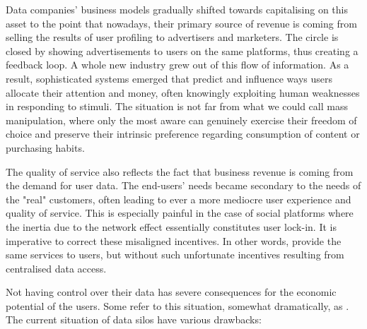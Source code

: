 Data companies' business models gradually shifted towards capitalising on this asset to the point that nowadays, their primary source of revenue is coming from selling the results of user profiling to advertisers and marketers. The circle is closed by showing advertisements to users on the same platforms, thus creating a feedback loop. A whole new industry grew out of this flow of information. As a result, sophisticated systems emerged that predict and influence ways users allocate their attention and money, often knowingly exploiting human weaknesses in responding to stimuli. The situation is not far from what we could call mass manipulation, where only the most aware can genuinely exercise their freedom of choice and preserve their intrinsic preference regarding consumption of content or purchasing habits.

The quality of service also reflects the fact that business revenue is coming from the demand for user data. The end-users' needs became secondary to the needs of the "real" customers, often leading to ever a more mediocre user experience and quality of service. This is especially painful in the case of social platforms where the inertia due to the network effect essentially constitutes user lock-in. It is imperative to correct these misaligned incentives. In other words, provide the same services to users, but without such unfortunate incentives resulting from centralised data access.

Not having control over their data has severe consequences for the economic potential of the users. Some refer to this situation, somewhat dramatically, as . 
The current situation of data silos have various drawbacks: 

